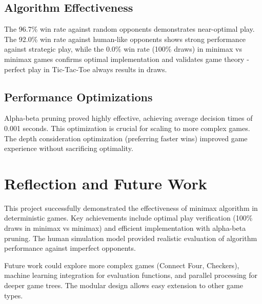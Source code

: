 \documentclass[12pt]{article}
\begin{document}
\subsection{Algorithm Effectiveness}

The 96.7\% win rate against random opponents demonstrates near-optimal play. The 92.0\% win rate against human-like opponents shows strong performance against strategic play, while the 0.0\% win rate (100\% draws) in minimax vs minimax games confirms optimal implementation and validates game theory - perfect play in Tic-Tac-Toe always results in draws.

\subsection{Performance Optimizations}

Alpha-beta pruning proved highly effective, achieving average decision times of 0.001 seconds. This optimization is crucial for scaling to more complex games. The depth consideration optimization (preferring faster wins) improved game experience without sacrificing optimality.

\section{Reflection and Future Work}

This project successfully demonstrated the effectiveness of minimax algorithm in deterministic games. Key achievements include optimal play verification (100\% draws in minimax vs minimax) and efficient implementation with alpha-beta pruning. The human simulation model provided realistic evaluation of algorithm performance against imperfect opponents.

Future work could explore more complex games (Connect Four, Checkers), machine learning integration for evaluation functions, and parallel processing for deeper game trees. The modular design allows easy extension to other game types.
\end{document}
